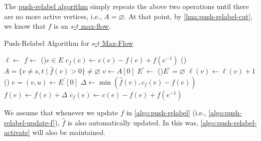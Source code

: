 The \hyperref[algo:push-relabel]{push-relabel algorithm} simply repeats the above two operations until there are no more active vertices, i.e., \(A = \varnothing \). At that point, by \autoref{lma:push-relabel-cut}, we know that \(f\) is an \hyperref[prb:s-t-max-flow]{\(s\)-\(t\) max-flow}.

\begin{algorithm}[H]\label{algo:push-relabel}
	\DontPrintSemicolon{}
	\caption{Push-Relabel Algorithm for \hyperref[prb:s-t-max-flow]{\(s\)-\(t\) Max-Flow}}
	\BlankLine
	\(\ell \gets\)
	\(f \gets\)
	\For(){\(e \in E\)}{
		\(c_f(e) \gets c(e) - f(e) + f(e^{-1} )\)\;
	}
	\;
	\While(\label{algo:push-relabel-activate}){\(A = \{ v \neq s, t \mid \hat{f} (v) > 0 \}  \neq \varnothing \)}{
		\(v \gets A[0]\)\label{algo:push-relabel-active}
		\(E^{\prime} \gets\)
		\uIf(){\(E^{\prime} = \varnothing \)}{
			\(\ell (v) \gets \ell (v) + 1\)\;
		}\Else(){
			\(e = (v, u)\gets E^{\prime} [0]\)
			\(\Delta \gets \min (\hat{f} (v), c_f(e) - f(e))\)
			\(f(e) \gets f(e) + \Delta \)\label{algo:push-relabel-update-f}\;
			\(c_f(e) \gets c(e) - f(e) + f(e^{-1} )\)\;
		}
	}
	\;
\end{algorithm}

\begin{remark}
	We assume that whenever we update \(f\) in \autoref{algo:push-relabel} (i.e., \autoref{algo:push-relabel-update-f}), \(\hat{f} \) is also automatically updated. In this was, \autoref{algo:push-relabel-activate} will also be maintained.
\end{remark}

